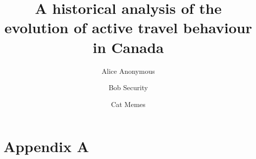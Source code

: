 \documentclass[preprint, 3p,
authoryear]{elsarticle} %
\renewenvironment{abstract}{}{}
\begin{document}
\begin{frontmatter}

  \title{A historical analysis of the evolution of active travel
behaviour in Canada}
    \author[Some Institute of Technology]{Alice Anonymous%
  }
    \author[Some Institute of Technology]{Bob Security%
  }
    \author[Some Institute of Technology]{Cat Memes%
  }
  
  \begin{abstract}
  
  \end{abstract}
  
 \end{frontmatter}

\section*{Appendix A}\label{appendix-a}

\begingroup\fontsize{8}{10}\selectfont
\end{document}
